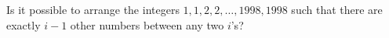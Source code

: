 Is it possible to arrange the integers $1, 1, 2, 2, \ldots, 1998, 1998$ such that there are exactly $i - 1$ other numbers between any two $i$'s?
